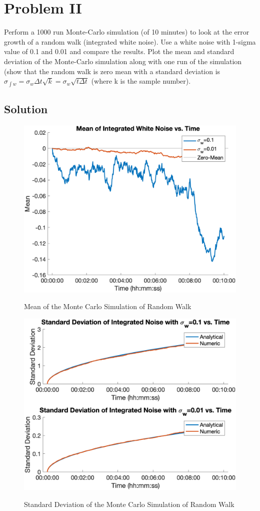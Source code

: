 \documentclass{article}
\begin{document}
\section*{Problem II}
Perform a 1000 run Monte-Carlo simulation (of 10 minutes) to look at the error growth of a
random walk (integrated white noise). Use a white noise with 1-sigma value of 0.1 and 0.01
and compare the results. Plot the mean and standard deviation of the Monte-Carlo simulation
along with one run of the simulation (show that the random walk is zero mean with a
standard deviation is $\sigma_{\int w} = \sigma_w \Delta t\sqrt{k} = \sigma_w\sqrt{t \Delta t}$ (where k is the sample number).

\subsection*{Solution}
\begin{figure}[H]
    \centering
    \includegraphics[width=0.75\linewidth]{../figures/p2_rw_mean.png}\label{fig:p2_rw_mean}
    \caption{Mean of the Monte Carlo Simulation of Random Walk}
\end{figure}

\begin{figure}[H]
    \centering
    \includegraphics[width=0.75\linewidth]{../figures/p2_rw_sigma.png}\label{fig:p2_rw_sigma}
    \caption{Standard Deviation of the Monte Carlo Simulation of Random Walk}
\end{figure}
\end{document}
